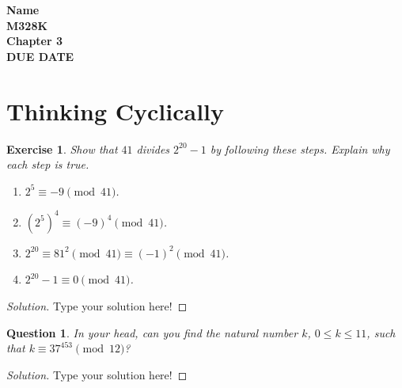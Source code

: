 \documentclass[11pt,leqno]{article}
\newtheorem{exer}[thm]{Exercise}
\newtheorem{ques}[thm]{Question}
\theoremstyle{definition}
\begin{document}
\thispagestyle{plain}
\begin{flushright}
\large{\textbf{Name \\
M328K  \\
Chapter 3\\
DUE DATE \\}}
\end{flushright}



\setcounter{tocdepth}{3}

\section*{Thinking Cyclically}


\setcounter{section}{3}

\setcounter{thm}{0}





\begin{exer}
Show that $41$ divides $2^{20}-1$ by following these steps.  Explain
why each step is true.
\begin{enumerate} \item $2^5 \equiv -9 \pmod{41}$.  \item $(2^5)^4
\equiv (-9)^4 \pmod{41}$.  \item $2^{20} \equiv 81^2 \pmod{41}
\equiv (-1)^2\pmod{41}$.  \item $2^{20} - 1 \equiv 0 \pmod{41}$.
\end{enumerate}
\end{exer}

\begin{proof}[Solution]
Type your solution here!
\end{proof}

\begin{ques}
In your head, can you find the natural number $k$, $0 \leq k \leq
11$, such that $k \equiv 37^{453} \pmod{12}$?
\end{ques}

\begin{proof}[Solution]
Type your solution here!
\end{proof}
\end{document}
